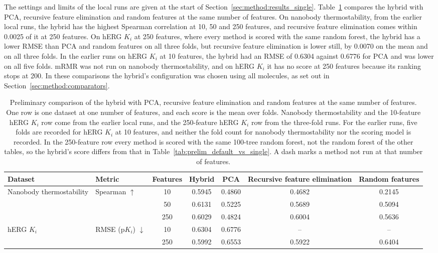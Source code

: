 The settings and limits of the local runs are given at the start of Section~\ref{sec:method:results_single}. Table~\ref{tab:prelim_reduction} compares the hybrid with PCA, recursive feature elimination and random features at the same number of features. On nanobody thermostability, from the earlier local runs, the hybrid has the highest Spearman correlation at 10, 50 and 250 features, and recursive feature elimination comes within 0.0025 of it at 250 features. On hERG $K_i$ at 250 features, where every method is scored with the same random forest, the hybrid has a lower RMSE than PCA and random features on all three folds, but recursive feature elimination is lower still, by 0.0070 on the mean and on all three folds. In the earlier runs on hERG $K_i$ at 10 features, the hybrid had an RMSE of 0.6304 against 0.6776 for PCA and was lower on all five folds. mRMR was not run on nanobody thermostability, and on hERG $K_i$ it has no score at 250 features because its ranking stops at 200. In these comparisons the hybrid's configuration was chosen using all molecules, as set out in Section~\ref{sec:method:comparators}.

\begin{table}[htbp]
\centering
\small
\begin{adjustbox}{max width=\textwidth,max totalheight=0.78\textheight}
\begin{tabular}{@{}llccccc@{}}
\toprule
Dataset & Metric & Features & Hybrid & PCA & Recursive feature elimination & Random features \\
\midrule
Nanobody thermostability & Spearman $\uparrow$ & 10 & 0.5945 & 0.4860 & 0.4682 & 0.2145 \\
 & & 50 & 0.6131 & 0.5225 & 0.5689 & 0.5094 \\
 & & 250 & 0.6029 & 0.4824 & 0.6004 & 0.5636 \\
\midrule
hERG $K_i$ & RMSE (p$K_i$) $\downarrow$ & 10 & 0.6304 & 0.6776 & -- & -- \\
 & & 250 & 0.5992 & 0.6553 & 0.5922 & 0.6404 \\
\bottomrule
\end{tabular}
\end{adjustbox}
\caption[Preliminary: the hybrid against PCA, recursive feature elimination and random features.]{Preliminary comparison of the hybrid with PCA, recursive feature elimination and random features at the same number of features. One row is one dataset at one number of features, and each score is the mean over folds. Nanobody thermostability and the 10-feature hERG $K_i$ row come from the earlier local runs, and the 250-feature hERG $K_i$ row from the three-fold runs. For the earlier runs, five folds are recorded for hERG $K_i$ at 10 features, and neither the fold count for nanobody thermostability nor the scoring model is recorded. In the 250-feature row every method is scored with the same 100-tree random forest, not the random forest of the other tables, so the hybrid's score differs from that in Table~\ref{tab:prelim_default_vs_single}. A dash marks a method not run at that number of features.}
\label{tab:prelim_reduction}
\end{table}


